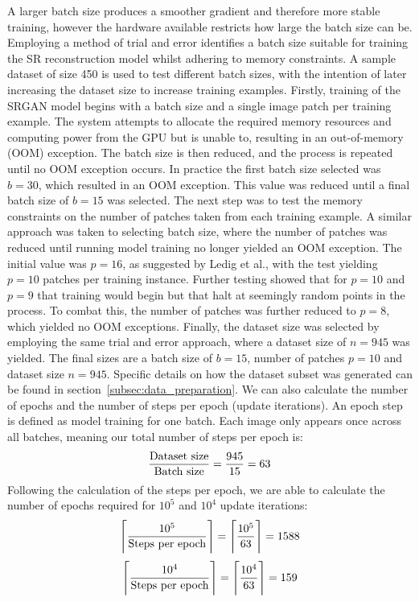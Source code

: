 A larger batch size produces a smoother gradient and therefore more stable training, however the hardware available restricts how large the batch size can be. Employing a method of trial and error identifies a batch size suitable for training the SR reconstruction model whilst adhering to memory constraints. A sample dataset of size 450 is used to test different batch sizes, with the intention of later increasing the dataset size to increase training examples. Firstly, training of the SRGAN model begins with a batch size and a single image patch per training example. The system attempts to allocate the required memory resources and computing power from the GPU but is unable to, resulting in an out-of-memory (OOM) exception. The batch size is then reduced, and the process is repeated until no OOM exception occurs. In practice the first batch size selected was $b = 30$, which resulted in an OOM exception. This value was reduced until a final batch size of $b = 15$ was selected. The next step was to test the memory constraints on the number of patches taken from each training example. A similar approach was taken to selecting batch size, where the number of patches was reduced until running model training no longer yielded an OOM exception. The initial value was $p = 16$, as suggested by Ledig et al., with the test yielding $p = 10$ patches per training instance. Further testing showed that for $p = 10$ and $p = 9$ that training would begin but that halt at seemingly random points in the process. To combat this, the number of patches was further reduced to $p = 8$, which yielded no OOM exceptions. Finally, the dataset size was selected by employing the same trial and error approach, where a dataset size of $n = 945$ was yielded. The final sizes are a batch size of $b = 15$, number of patches $p = 10$ and dataset size $n = 945$. Specific details on how the dataset subset was generated can be found in section~\ref{subsec:data_preparation}. We can also calculate the number of epochs and the number of steps per epoch (update iterations). An epoch step is defined as model training for one batch. Each image only appears once across all batches, meaning our total number of steps per epoch is:
\[\frac{\textnormal{Dataset size}}{\textnormal{Batch size}} = \frac{945}{15} = 63\]
Following the calculation of the steps per epoch, we are able to calculate the number of epochs required for $10^5$ and $10^4$ update iterations:
\[\Bigg\lceil\frac{10^5}{\textnormal{Steps per epoch}}\Bigg\rceil = \Bigg\lceil\frac{10^5}{63}\Bigg\rceil = 1588\]
\[\Bigg\lceil\frac{10^4}{\textnormal{Steps per epoch}}\Bigg\rceil = \Bigg\lceil\frac{10^4}{63}\Bigg\rceil = 159\]
